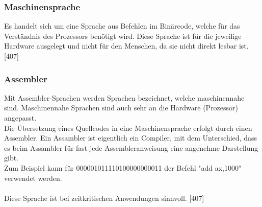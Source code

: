 \documentclass[12pt,a4paper]{report}
\begin{document}
\begin{onehalfspace}
\subsubsection{Maschinensprache}
Es handelt sich um eine Sprache aus Befehlen im Binärcode, welche für das Verständnis des Prozessors benötigt wird. Diese Sprache ist für die jeweilige Hardware ausgelegt und nicht für den Menschen, da sie nicht direkt lesbar ist. [407]

\subsubsection{Assembler}
Mit Assembler-Sprachen werden Sprachen bezeichnet, welche maschinennahe sind. Maschinennahe Sprachen sind auch sehr an die Hardware (Prozessor) angepasst.\\
Die Übersetzung eines Quellcodes in eine Maschinensprache erfolgt durch einen Assembler. Ein Assambler ist eigentlich ein Compiler, mit dem Unterschied, dass es beim Assambler für fast jede Assembleranweisung eine angenehme Darstellung gibt.
\\Zum Beispiel kann für 000001011110100000000011 der Befehl "{}add ax,1000"{} verwendet werden.\\
\\Diese Sprache ist bei zeitkritischen Anwendungen sinnvoll. [407]


\end{onehalfspace}
\end{document}
